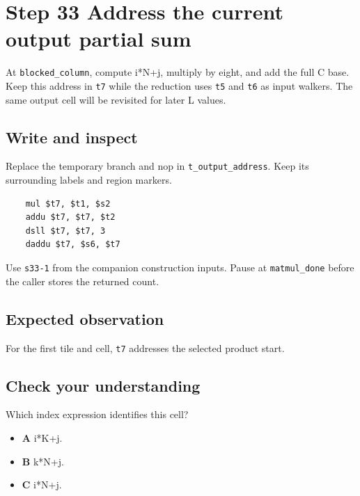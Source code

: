 \section{Step 33 Address the current output partial sum}\label{matmul-s33}

At \texttt{blocked\_column}, compute i*N+j, multiply by eight, and add the full C base. Keep this address in \texttt{t7} while the reduction uses \texttt{t5} and \texttt{t6} as input walkers. The same output cell will be revisited for later L values.

\subsection{Write and inspect}
Replace the temporary branch and nop in \texttt{t\_output\_address}. Keep its surrounding labels and region markers.

\begin{verbatim}
    mul $t7, $t1, $s2
    addu $t7, $t7, $t2
    dsll $t7, $t7, 3
    daddu $t7, $s6, $t7
\end{verbatim}
Use \texttt{s33-1} from the companion construction inputs. Pause at \texttt{matmul\_done} before the caller stores the returned count.

\subsection{Expected observation}
For the first tile and cell, \texttt{t7} addresses the selected product start.

\subsection{Check your understanding}
Which index expression identifies this cell?

\begin{itemize}
  \item \textbf{A} i*K+j.
  \item \textbf{B} k*N+j.
  \item \textbf{C} i*N+j.
\end{itemize}
